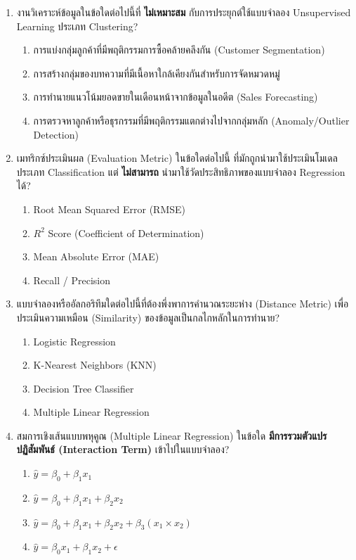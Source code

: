 \documentclass[a4paper,12pt]{article}
\begin{document}
\begin{enumerate}[label=\textbf{\arabic*.}]

\item งานวิเคราะห์ข้อมูลในข้อใดต่อไปนี้ที่ \textbf{ไม่เหมาะสม} กับการประยุกต์ใช้แบบจำลอง Unsupervised Learning ประเภท Clustering?
\begin{enumerate}[label=\alph*.]
    \item การแบ่งกลุ่มลูกค้าที่มีพฤติกรรมการซื้อคล้ายคลึงกัน (Customer Segmentation)
    \item การสร้างกลุ่มของบทความที่มีเนื้อหาใกล้เคียงกันสำหรับการจัดหมวดหมู่
    \item การทำนายแนวโน้มยอดขายในเดือนหน้าจากข้อมูลในอดีต (Sales Forecasting)
    \item การตรวจหาลูกค้าหรือธุรกรรมที่มีพฤติกรรมแตกต่างไปจากกลุ่มหลัก (Anomaly/Outlier Detection)
\end{enumerate}

\item เมทริกซ์ประเมินผล (Evaluation Metric) ในข้อใดต่อไปนี้ ที่มักถูกนำมาใช้ประเมินโมเดลประเภท Classification แต่ \textbf{ไม่สามารถ} นำมาใช้วัดประสิทธิภาพของแบบจำลอง Regression ได้?
\begin{enumerate}[label=\alph*.]
    \item Root Mean Squared Error (RMSE)
    \item $R^2$ Score (Coefficient of Determination)
    \item Mean Absolute Error (MAE)
    \item Recall / Precision
\end{enumerate}

\item แบบจำลองหรืออัลกอริทึมใดต่อไปนี้ที่ต้องพึ่งพาการคำนวณระยะห่าง (Distance Metric) เพื่อประเมินความเหมือน (Similarity) ของข้อมูลเป็นกลไกหลักในการทำนาย?
\begin{enumerate}[label=\alph*.]
    \item Logistic Regression
    \item K-Nearest Neighbors (KNN)
    \item Decision Tree Classifier
    \item Multiple Linear Regression
\end{enumerate}

\item สมการเชิงเส้นแบบพหุคูณ (Multiple Linear Regression) ในข้อใด \textbf{มีการรวมตัวแปรปฏิสัมพันธ์ (Interaction Term)} เข้าไปในแบบจำลอง?
\begin{enumerate}[label=\alph*.]
    \item $\hat{y} = \beta_0 + \beta_1 x_1$
    \item $\hat{y} = \beta_0 + \beta_1 x_1 + \beta_2 x_2$
    \item $\hat{y} = \beta_0 + \beta_1 x_1 + \beta_2 x_2 + \beta_3(x_1 \times x_2)$
    \item $\hat{y} = \beta_0 x_1 + \beta_1 x_2 + \epsilon$
\end{enumerate}


\end{enumerate}
\end{document}
